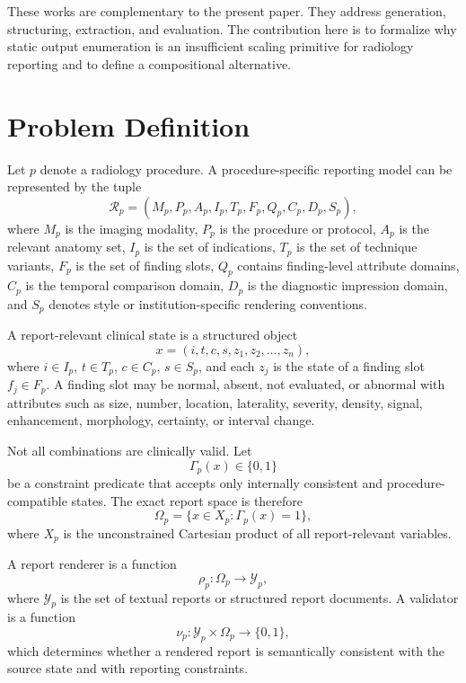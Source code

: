 \documentclass[11pt]{article}
\begin{document}
These works are complementary to the present paper. They address generation, structuring, extraction, and evaluation. The contribution here is to formalize why static output enumeration is an insufficient scaling primitive for radiology reporting and to define a compositional alternative.

\section{Problem Definition}

Let $p$ denote a radiology procedure. A procedure-specific reporting model can be represented by the tuple
\begin{equation}
    \mathcal{R}_p = (M_p, P_p, A_p, I_p, T_p, F_p, Q_p, C_p, D_p, S_p),
\end{equation}
where $M_p$ is the imaging modality, $P_p$ is the procedure or protocol, $A_p$ is the relevant anatomy set, $I_p$ is the set of indications, $T_p$ is the set of technique variants, $F_p$ is the set of finding slots, $Q_p$ contains finding-level attribute domains, $C_p$ is the temporal comparison domain, $D_p$ is the diagnostic impression domain, and $S_p$ denotes style or institution-specific rendering conventions.

A report-relevant clinical state is a structured object
\begin{equation}
    x = (i,t,c,s, z_1, z_2, \ldots, z_n),
\end{equation}
where $i \in I_p$, $t \in T_p$, $c \in C_p$, $s \in S_p$, and each $z_j$ is the state of a finding slot $f_j \in F_p$. A finding slot may be normal, absent, not evaluated, or abnormal with attributes such as size, number, location, laterality, severity, density, signal, enhancement, morphology, certainty, or interval change.

Not all combinations are clinically valid. Let
\begin{equation}
    \Gamma_p(x) \in \{0,1\}
\end{equation}
be a constraint predicate that accepts only internally consistent and procedure-compatible states. The exact report space is therefore
\begin{equation}
    \Omega_p = \{x \in X_p : \Gamma_p(x)=1\},
\end{equation}
where $X_p$ is the unconstrained Cartesian product of all report-relevant variables.

A report renderer is a function
\begin{equation}
    \rho_p : \Omega_p \rightarrow \mathcal{Y}_p,
\end{equation}
where $\mathcal{Y}_p$ is the set of textual reports or structured report documents. A validator is a function
\begin{equation}
    \nu_p : \mathcal{Y}_p \times \Omega_p \rightarrow \{0,1\},
\end{equation}
which determines whether a rendered report is semantically consistent with the source state and with reporting constraints.
\end{document}
